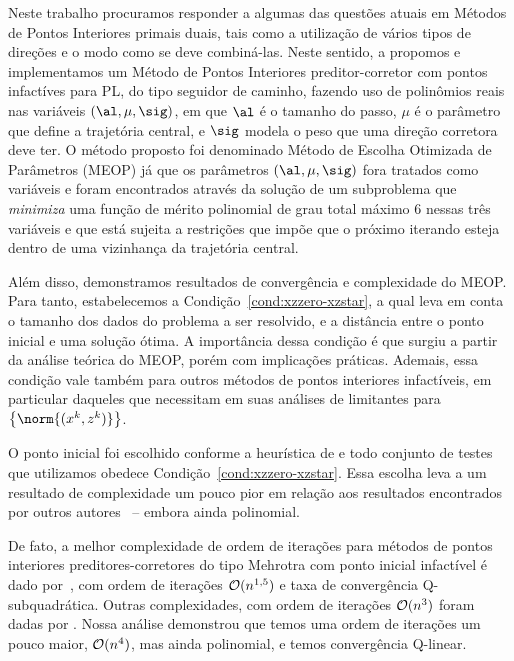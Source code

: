 \label{chap:final_remarks}






Neste trabalho procuramos responder a algumas das questões atuais em Métodos de Pontos Interiores primais duais, tais como a utilização de vários tipos de direções e o modo como se deve combiná-las. Neste sentido, a propomos e implementamos  um Método de Pontos Interiores preditor-corretor com pontos infactíves para \ac{PL}, do tipo seguidor de caminho, fazendo  uso de polinômios reais nas variáveis $(\al,\mu,\sig)$, em que $\al$ é o tamanho do passo, $\mu$ é o parâmetro que define a trajetória central, e $\sig$ modela o peso que uma direção corretora deve ter. O método proposto foi denominado Método de Escolha Otimizada de Parâmetros (MEOP) já que os  parâmetros $(\al,\mu,\sig)$ fora tratados como variáveis e foram encontrados  através da solução de um subproblema que \emph{minimiza} uma função de mérito polinomial de grau total máximo 6 nessas três variáveis e que está sujeita a restrições que impõe que o próximo iterando esteja dentro de uma vizinhança da trajetória central. 



Além disso, demonstramos resultados de convergência e complexidade do MEOP. Para tanto, estabelecemos a  Condição~\ref{cond:xzzero-xzstar}, a qual leva em conta o tamanho dos dados do problema a  ser  resolvido, e a distância entre o ponto inicial e uma solução ótima. A importância dessa condição é que surgiu a partir da análise teórica do MEOP, porém com implicações práticas.  Ademais, essa condição vale também para outros métodos de pontos interiores infactíveis, em particular daqueles que necessitam em suas análises de limitantes para $\left\{\norm{(\xk,\zk)}\right\}$.

O ponto inicial foi escolhido  conforme a heurística de \textcite{Mehrotra:1992wr} e todo conjunto de testes que utilizamos obedece Condição~\ref{cond:xzzero-xzstar}.  Essa escolha leva a um   resultado de complexidade um pouco pior  em relação aos resultados encontrados por outros autores~\cite{Zhang:1995fu,Zhang:2006ic,Wright:1993je,Wright:1996kj} -- embora ainda polinomial.


De fato, a melhor complexidade de ordem de iterações para métodos de pontos interiores preditores-corretores do tipo Mehrotra com ponto inicial infactível é dado por~\textcite{Zhang:1996it}, com ordem de iterações $\mathcal{O}(n^{\num{1.5}})$ e taxa de convergência Q-subquadrática. Outras complexidades, com ordem de iterações $\mathcal{O}(n^{\num{3}})$ foram dadas por \textcite{Zhang:2006ic,Wright:1996kj}. Nossa análise demonstrou que temos uma ordem de iterações um pouco maior, $\mathcal{O}(n^{\num{4}})$, mas ainda polinomial, e temos convergência Q-linear. 

